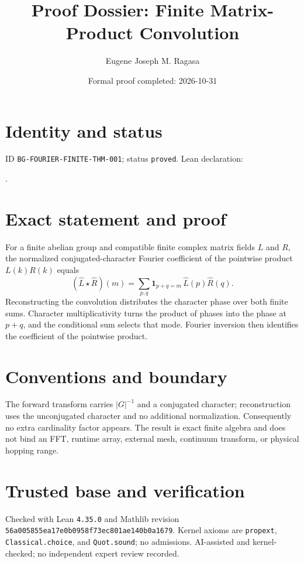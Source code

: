 \documentclass[11pt]{article}
\title{Proof Dossier: Finite Matrix-Product Convolution}\author{Eugene Joseph M. Ragasa}\date{Formal proof completed: 2026-10-31}
\begin{document}
\maketitle
\section{Identity and status}
ID \texttt{BG-FOURIER-FINITE-THM-001}; status \texttt{proved}. Lean declaration:
\par{}.
\section{Exact statement and proof}
For a finite abelian group and compatible finite complex matrix fields $L$ and $R$, the
normalized conjugated-character Fourier coefficient of the pointwise product $L(k)R(k)$ equals
\[
  (\widehat L\star\widehat R)(m)
  =\sum_{p,q}\mathbf 1_{p+q=m}\,\widehat L(p)\widehat R(q).
\]
Reconstructing the convolution distributes the character phase over both finite sums. Character
multiplicativity turns the product of phases into the phase at $p+q$, and the conditional sum
selects that mode. Fourier inversion then identifies the coefficient of the pointwise product.
\section{Conventions and boundary}
The forward transform carries $|G|^{-1}$ and a conjugated character; reconstruction uses the
unconjugated character and no additional normalization. Consequently no extra cardinality factor
appears. The result is exact finite algebra and does not bind an FFT, runtime array, external mesh,
continuum transform, or physical hopping range.
\section{Trusted base and verification}
Checked with Lean \texttt{4.35.0} and Mathlib revision
\texttt{56a005855ea17e0b0958f73ec801ae140b0a1679}. Kernel axioms are
\texttt{propext}, \texttt{Classical.choice}, and \texttt{Quot.sound}; no admissions.
AI-assisted and kernel-checked; no independent expert review recorded.
\end{document}
